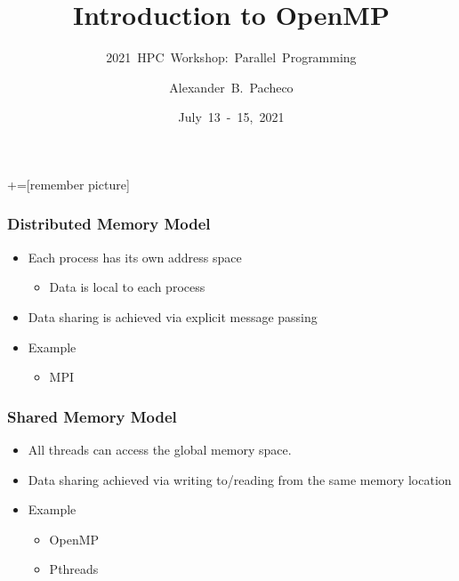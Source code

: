 \documentclass[10pt,t]{beamer}
\title{Introduction to OpenMP}
\subtitle{2021~HPC~Workshop:~Parallel~Programming}
\author{\large{Alexander~B.~Pacheco}}
\institute[Lehigh University Research Computing]{\href{http://researchcomputing.lehigh.edu}{Research~Computing}}
\date{July~13~-~15,~2021}
\begin{document}
+=[remember picture]

\begin{frame}
  \titlepage
\end{frame}

\begin{frame}
  \frametitle{Distributed Memory Model}
    \begin{itemize}
      \item Each process has its own address space
      \begin{itemize}
        \item Data is local to each process
      \end{itemize}
      \item Data sharing is achieved via explicit message passing
      \item Example
      \begin{itemize}
        \item MPI
      \end{itemize}
    \end{itemize}

    
\end{frame}

\begin{frame}
  \frametitle{Shared Memory Model}
    \begin{itemize}
      \item All threads can access the global memory space.
      \item Data sharing achieved via writing to/reading from the same memory location
      \item Example
      \begin{itemize}
        \item OpenMP
        \item Pthreads
      \end{itemize}
    \end{itemize}
    
\end{frame}
\end{document}
